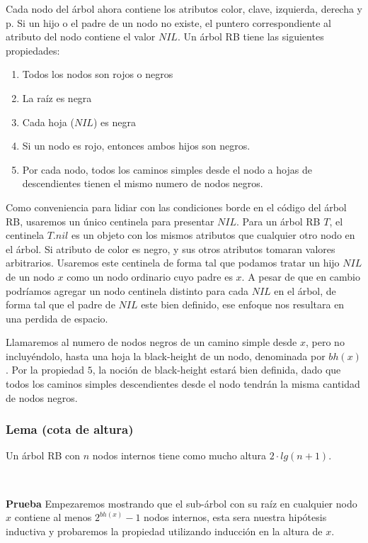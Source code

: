\documentclass[10pt, a4paper]{report}
\begin{document}
Cada nodo del \'arbol ahora contiene los atributos color, clave, izquierda, derecha y p. Si un hijo o el padre de un nodo no existe, el puntero correspondiente al atributo del nodo contiene el valor $NIL$. Un \'arbol RB tiene las siguientes propiedades:

\begin{enumerate}
 \item Todos los nodos son rojos o negros
 \item La ra\'iz es negra
 \item Cada hoja ($NIL$) es negra
 \item Si un nodo es rojo, entonces ambos hijos son negros.
 \item Por cada nodo, todos los caminos simples desde el nodo a hojas de descendientes tienen el mismo numero de nodos negros.
\end{enumerate}

Como conveniencia para lidiar con las condiciones borde en el c\'odigo del \'arbol RB, usaremos un \'unico centinela para presentar $NIL$. Para un \'arbol RB $T$, el centinela $T.nil$ es un objeto con los mismos atributos que cualquier otro nodo en el \'arbol. Si atributo de color es negro, y sus otros atributos tomaran valores arbitrarios. Usaremos este centinela de forma tal que podamos tratar un hijo $NIL$ de un nodo $x$ como un nodo ordinario cuyo padre es $x$. A pesar de que en cambio podr\'iamos agregar un nodo centinela distinto para cada $NIL$ en el \'arbol, de forma tal que el padre de $NIL$ este bien definido, ese enfoque nos resultara en una perdida de espacio.

Llamaremos al numero de nodos negros de un camino simple desde $x$, pero no incluy\'endolo, hasta una hoja la black-height de un nodo, denominada por $bh(x)$. Por la propiedad $5$, la noci\'on de black-height estar\'a bien definida, dado que todos los caminos simples descendientes desde el nodo tendr\'an la misma cantidad de nodos negros.

\subsubsection{Lema (cota de altura)}
Un \'arbol RB con $n$ nodos internos tiene como mucho altura $2\cdot lg(n+1)$.

~

\textbf{Prueba} Empezaremos mostrando que el sub-\'arbol con su ra\'iz en cualquier nodo $x$ contiene al menos $2^{bh(x)}-1$ nodos internos, esta sera nuestra hip\'otesis inductiva y probaremos la propiedad utilizando inducci\'on en la altura de $x$. 
\end{document}
